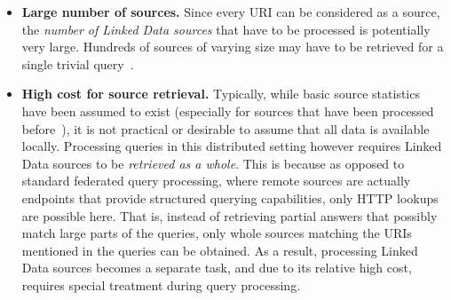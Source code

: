 \begin{itemize}
\item \textbf{Large number of sources.} Since every URI can be
  considered as a source, the \emph{number of Linked Data sources}
  that have to be processed is potentially very large. Hundreds of
  sources of varying size may have to be retrieved for a single
  trivial query~\cite{ladwig_linked_2010}.

\item \textbf{High cost for source retrieval.} Typically, while basic
  source statistics have been assumed to exist (especially for sources
  that have been processed before~\cite{ladwig_linked_2010}), it is
  not practical or desirable to assume that all data is available
  locally. Processing queries in
  this distributed setting however requires Linked Data sources to be
  \emph{retrieved as a whole}. This is because as opposed to standard
  federated query processing, where remote sources are actually
  endpoints that provide structured querying capabilities, only HTTP
  lookups are possible here. That is, instead of retrieving partial
  answers that possibly match large parts of the queries, only whole
  sources matching the URIs mentioned in the queries can be
  obtained. As a result, processing Linked Data sources becomes a
  separate task, and due to its relative high cost, requires special
  treatment during query processing.


\end{itemize}
